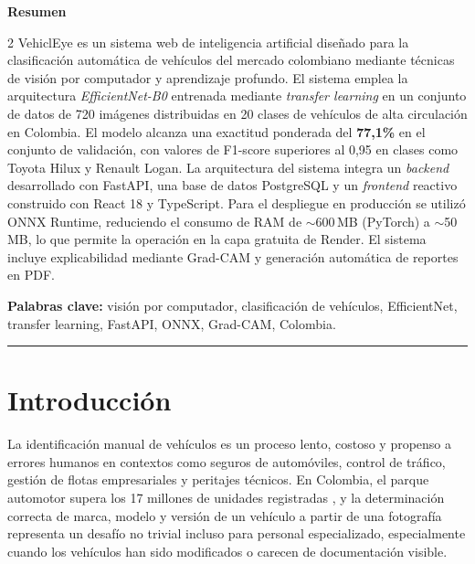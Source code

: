 \documentclass[12pt,a4paper]{article}
\begin{document}
\newpage

\thispagestyle{fancy}
\begin{center}
    {\large \bfseries Resumen}
\end{center}

\begin{multicols}{2}
\noindent
VehiclEye es un sistema web de inteligencia artificial diseñado para la clasificación automática de vehículos del mercado colombiano mediante técnicas de visión por computador y aprendizaje profundo. El sistema emplea la arquitectura \textit{EfficientNet-B0} entrenada mediante \textit{transfer learning} en un conjunto de datos de 720 imágenes distribuidas en 20 clases de vehículos de alta circulación en Colombia. El modelo alcanza una exactitud ponderada del \textbf{77,1\%} en el conjunto de validación, con valores de F1-score superiores al 0,95 en clases como Toyota Hilux y Renault Logan. La arquitectura del sistema integra un \textit{backend} desarrollado con FastAPI, una base de datos PostgreSQL y un \textit{frontend} reactivo construido con React 18 y TypeScript. Para el despliegue en producción se utilizó ONNX Runtime, reduciendo el consumo de RAM de $\sim$600\,MB (PyTorch) a $\sim$50\,MB, lo que permite la operación en la capa gratuita de Render. El sistema incluye explicabilidad mediante Grad-CAM y generación automática de reportes en PDF.

\vspace{4pt}
\noindent \textbf{Palabras clave:} visión por computador, clasificación de vehículos, EfficientNet, transfer learning, FastAPI, ONNX, Grad-CAM, Colombia.
\end{multicols}

\vspace{0.5cm}
\hrule
\vspace{0.8cm}

\tableofcontents
\newpage

\section{Introducción}

La identificación manual de vehículos es un proceso lento, costoso y propenso a errores humanos en contextos como seguros de automóviles, control de tráfico, gestión de flotas empresariales y peritajes técnicos. En Colombia, el parque automotor supera los 17 millones de unidades registradas \cite{runt2023}, y la determinación correcta de marca, modelo y versión de un vehículo a partir de una fotografía representa un desafío no trivial incluso para personal especializado, especialmente cuando los vehículos han sido modificados o carecen de documentación visible.
\end{document}
